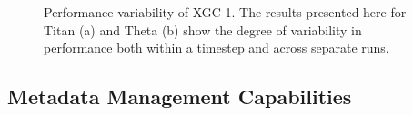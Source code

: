 \begin{figure}[tbh]
\vspace{-10pt}
\center
{}
\caption{Performance variability of XGC-1.  The results presented here for Titan (a) and Theta (b) show the degree of variability in performance both within a timestep and across separate runs.}
\label{fig:variability}
\end{figure}







\subsection{Metadata Management Capabilities 
}
\label{sec:metadata}


